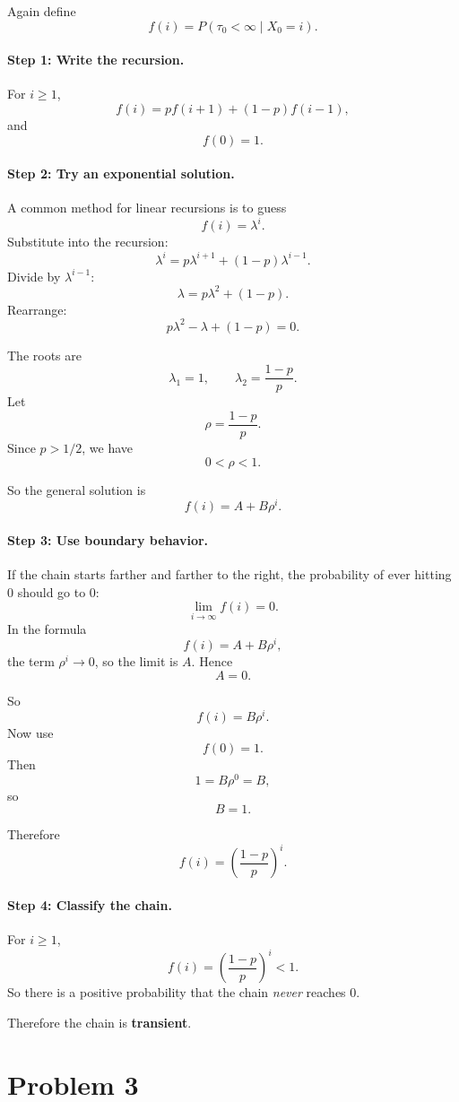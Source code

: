 \documentclass[11pt]{article}
\begin{document}
Again define
\[
f(i)=P(\tau_0<\infty \mid X_0=i).
\]

\paragraph{Step 1: Write the recursion.}

For $i\ge1$,
\[
f(i)=pf(i+1)+(1-p)f(i-1),
\]
and
\[
f(0)=1.
\]

\paragraph{Step 2: Try an exponential solution.}

A common method for linear recursions is to guess
\[
f(i)=\lambda^i.
\]
Substitute into the recursion:
\[
\lambda^i=p\lambda^{i+1}+(1-p)\lambda^{i-1}.
\]
Divide by $\lambda^{i-1}$:
\[
\lambda=p\lambda^2+(1-p).
\]
Rearrange:
\[
p\lambda^2-\lambda+(1-p)=0.
\]

The roots are
\[
\lambda_1=1,
\qquad
\lambda_2=\frac{1-p}{p}.
\]
Let
\[
\rho=\frac{1-p}{p}.
\]
Since $p>1/2$, we have
\[
0<\rho<1.
\]

So the general solution is
\[
f(i)=A+B\rho^i.
\]

\paragraph{Step 3: Use boundary behavior.}

If the chain starts farther and farther to the right, the probability of ever hitting $0$ should go to $0$:
\[
\lim_{i\to\infty}f(i)=0.
\]
In the formula
\[
f(i)=A+B\rho^i,
\]
the term $\rho^i\to0$, so the limit is $A$.
Hence
\[
A=0.
\]

So
\[
f(i)=B\rho^i.
\]
Now use
\[
f(0)=1.
\]
Then
\[
1=B\rho^0=B,
\]
so
\[
B=1.
\]

Therefore
\[
\boxed{
f(i)=\left(\frac{1-p}{p}\right)^i.
}
\]

\paragraph{Step 4: Classify the chain.}

For $i\ge1$,
\[
f(i)=\left(\frac{1-p}{p}\right)^i<1.
\]
So there is a positive probability that the chain \emph{never} reaches $0$.

Therefore the chain is \textbf{transient}.

\newpage

\section*{Problem 3}
\end{document}
